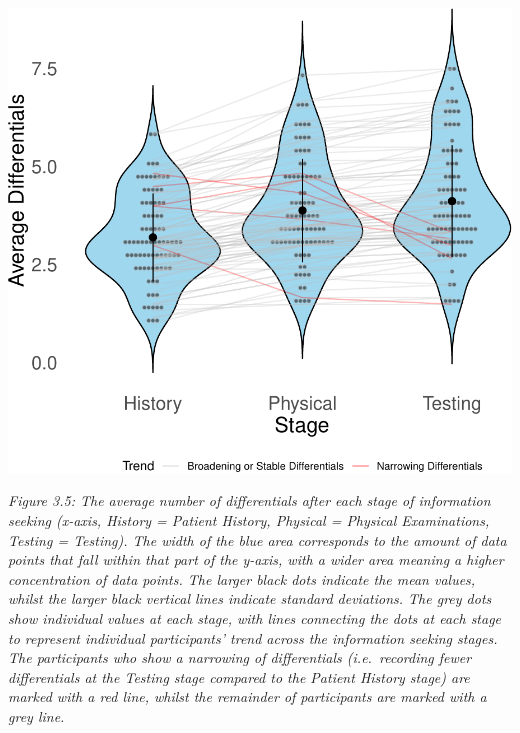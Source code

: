\documentclass[a4paper, nobind]{templates/ociamthesis}
\begin{document}
\newpage

\begin{center}\includegraphics[width=1\linewidth]{_main_files/figure-latex/diffsOverStages-1} \end{center}

\emph{Figure 3.5: The average number of differentials after each stage of information seeking (x-axis, History = Patient History, Physical = Physical Examinations, Testing = Testing). The width of the blue area corresponds to the amount of data points that fall within that part of the y-axis, with a wider area meaning a higher concentration of data points. The larger black dots indicate the mean values, whilst the larger black vertical lines indicate standard deviations. The grey dots show individual values at each stage, with lines connecting the dots at each stage to represent individual participants' trend across the information seeking stages. The participants who show a narrowing of differentials (i.e.~recording fewer differentials at the Testing stage compared to the Patient History stage) are marked with a red line, whilst the remainder of participants are marked with a grey line.}
\end{document}
